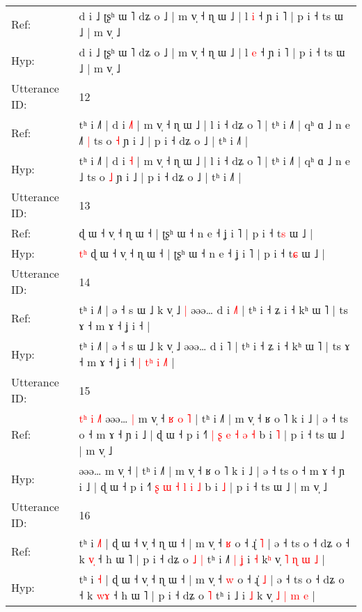 \documentclass[10pt]{article}
\DeclareRobustCommand{\hl}[1]{{\textcolor{red}{#1}}}
\begin{document}
\begin{longtable}{ll}
Ref: & d i ˩ ʈʂʰ ɯ ˥ dʑ o ˩ | m v̩ ˧ ɳ ɯ ˩ | l \hl{i} ˧ ɲ i ˥ | p i ˧ ts ɯ ˩ | m v̩ ˩
 \\
Hyp: & d i ˩ ʈʂʰ ɯ ˥ dʑ o ˩ | m v̩ ˧ ɳ ɯ ˩ | l \hl{e} ˧ ɲ i ˥ | p i ˧ ts ɯ ˩ | m v̩ ˩
 \\
\midrule
Utterance ID: & 12 \\
Ref: & tʰ i ˩˥ | d i \hl{˩}\hl{˥} | m v̩ ˧ ɳ ɯ ˩ | l i ˧ dʑ o ˥ | tʰ i ˩˥ | qʰ ɑ ˩ n e ˩\hl{˥}\hl{ }\hl{|} ts o \hl{˧} ɲ i ˩ | p i ˧ dʑ o ˩ | tʰ i ˩˥ |
 \\
Hyp: & tʰ i ˩˥ | d i \hl{}\hl{˧} | m v̩ ˧ ɳ ɯ ˩ | l i ˧ dʑ o ˥ | tʰ i ˩˥ | qʰ ɑ ˩ n e ˩\hl{}\hl{}\hl{} ts o \hl{˩} ɲ i ˩ | p i ˧ dʑ o ˩ | tʰ i ˩˥ |
 \\
\midrule
Utterance ID: & 13 \\
Ref: & \hl{}\hl{}\hl{}ɖ ɯ ˧ v̩ ˧ ɳ ɯ ˧ | ʈʂʰ ɯ ˧ n e ˧ ʝ i ˥ | p i ˧ t\hl{s} ɯ ˩ |
 \\
Hyp: & \hl{t}\hl{ʰ}\hl{ }ɖ ɯ ˧ v̩ ˧ ɳ ɯ ˧ | ʈʂʰ ɯ ˧ n e ˧ ʝ i ˥ | p i ˧ t\hl{ɕ} ɯ ˩ |
 \\
\midrule
Utterance ID: & 14 \\
Ref: & tʰ i ˩˥ | ə ˧ s ɯ ˩ k v̩ ˩\hl{ }\hl{|} əəə… d i \hl{˩}˥ | tʰ i ˧ ʑ i ˧ kʰ ɯ ˥ | ts ɤ ˧ m ɤ ˧ ʝ i ˧\hl{}\hl{}\hl{}\hl{}\hl{}\hl{}\hl{}\hl{}\hl{}\hl{} |
 \\
Hyp: & tʰ i ˩˥ | ə ˧ s ɯ ˩ k v̩ ˩\hl{}\hl{} əəə… d i \hl{}˥ | tʰ i ˧ ʑ i ˧ kʰ ɯ ˥ | ts ɤ ˧ m ɤ ˧ ʝ i ˧\hl{ }\hl{|}\hl{ }\hl{t}\hl{ʰ}\hl{ }\hl{i}\hl{ }\hl{˩}\hl{˥} |
 \\
\midrule
Utterance ID: & 15 \\
Ref: & \hl{t}\hl{ʰ}\hl{ }\hl{i}\hl{ }\hl{˩}\hl{˥}\hl{ }əəə…\hl{ }\hl{|} m v̩ ˧\hl{ }\hl{ʁ}\hl{ }\hl{o}\hl{ }\hl{˥} | tʰ i ˩˥ | m v̩ ˧ ʁ o ˥ k i ˩ | ə ˧ ts o ˧ m ɤ ˧ ɲ i ˩ | ɖ ɯ ˧ p i ˧˥ \hl{|} \hl{ʂ} \hl{e} \hl{˧} \hl{ə} \hl{˧} b i \hl{˥} | p i ˧ ts ɯ ˩ | m v̩ ˩
 \\
Hyp: & \hl{}\hl{}\hl{}\hl{}\hl{}\hl{}\hl{}\hl{}əəə…\hl{}\hl{} m v̩ ˧\hl{}\hl{}\hl{}\hl{}\hl{}\hl{} | tʰ i ˩˥ | m v̩ ˧ ʁ o ˥ k i ˩ | ə ˧ ts o ˧ m ɤ ˧ ɲ i ˩ | ɖ ɯ ˧ p i ˧˥ \hl{ʂ} \hl{ɯ} \hl{˧} \hl{l} \hl{i} \hl{˩} b i \hl{˩} | p i ˧ ts ɯ ˩ | m v̩ ˩
 \\
\midrule
Utterance ID: & 16 \\
Ref: & tʰ i \hl{˩}\hl{˥} | ɖ ɯ ˧ v̩ ˧ ɳ ɯ ˧ | m v̩ ˧ \hl{ʁ} o ˧ ɻ̍ \hl{˥} | ə ˧ ts o ˧ dʑ o ˧ k \hl{v}\hl{̩} ˧ h ɯ ˥ | p i ˧ dʑ o\hl{ }\hl{˩} \hl{|} tʰ i ˩\hl{˥}\hl{ }\hl{|}\hl{ }\hl{ʝ} i \hl{˧} k\hl{ʰ} v̩ \hl{˥} \hl{ɳ} \hl{ɯ} \hl{˩} |
 \\
Hyp: & tʰ i \hl{}\hl{˧} | ɖ ɯ ˧ v̩ ˧ ɳ ɯ ˧ | m v̩ ˧ \hl{w} o ˧ ɻ̍ \hl{˩} | ə ˧ ts o ˧ dʑ o ˧ k \hl{w}\hl{ɤ} ˧ h ɯ ˥ | p i ˧ dʑ o\hl{}\hl{} \hl{˥} tʰ i ˩\hl{}\hl{}\hl{}\hl{}\hl{} i \hl{˩} k\hl{} v̩ \hl{˩} \hl{|} \hl{m} \hl{e} |

\end{longtable}
\end{document}
